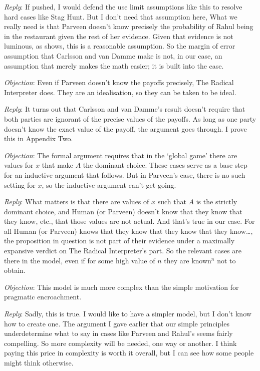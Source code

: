 \emph{Reply}: If pushed, I would defend the use limit assumptions like this to resolve hard cases like Stag Hunt. But I don't need that assumption here, What we really need is that Parveen doesn't know precisely the probability of Rahul being in the restaurant given the rest of her evidence. Given that evidence is not luminous, as \citet{Williamson2000} shows, this is a reasonable assumption. So the margin of error assumption that Carlsson and van Damme make is not, in our case, an assumption that merely makes the math easier; it is built into the case.

\emph{Objection}: Even if Parveen doesn't know the payoffs precisely, The Radical Interpreter does. They are an idealisation, so they can be taken to be ideal.

\emph{Reply}: It turns out that Carlsson and van Damme's result doesn't require that both parties are ignorant of the precise values of the payoffs. As long as one party doesn't know the exact value of the payoff, the argument goes through. I prove this in Appendix Two.

\emph{Objection}: The formal argument requires that in the `global game' there are values for $x$ that make $A$ the dominant choice. These cases serve as a base step for an inductive argument that follows. But in Parveen's case, there is no such setting for $x$, so the inductive argument can't get going.

\emph{Reply}: What matters is that there are values of $x$ such that $A$ is the strictly dominant choice, and Human (or Parveen) doesn't know that they know that they know, etc., that those values are not actual. And that's true in our case. For all Human (or Parveen) knows that they know that they know that they know{\ldots}, the proposition in question is not part of their evidence under a maximally expansive verdict on The Radical Interpreter's part. So the relevant cases are there in the model, even if for some high value of $n$ they are known$^n$ not to obtain.

\emph{Objection}: This model is much more complex than the simple motivation for pragmatic encroachment.

\emph{Reply}: Sadly, this is true. I would like to have a simpler model, but I don't know how to create one. The argument I gave earlier that our simple principles underdetermine what to say in cases like Parveen and Rahul's seems fairly compelling. So more complexity will be needed, one way or another. I think paying this price in complexity is worth it overall, but I can see how some people might think otherwise.

